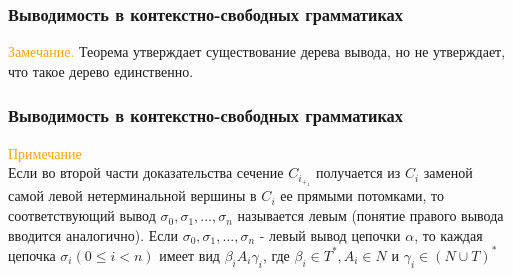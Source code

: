 \documentclass{beamer}
\begin{document}
		\begin{frame}
    \frametitle{Выводимость в контекстно-свободных грамматиках}
       
         \textcolor{orange}{Замечание.} Теорема утверждает существование дерева вывода, но не утверждает, что такое дерево единственно.
          
	\end{frame}
	
	\begin{frame}
    \frametitle{Выводимость в контекстно-свободных грамматиках}
    \textcolor{orange}{Примечание}\\
    Если во второй части доказательства сечение $C_i_+_1$ получается из $C_i$ заменой самой левой нетерминальной вершины в $C_i$ ее прямыми потомками, то соответствующий вывод $\sigma_0, \sigma_1, ..., \sigma_n$ называется левым (понятие правого вывода вводится аналогично).
    Если $\sigma_0, \sigma_1, ..., \sigma_n$ - левый вывод цепочки $\alpha$, то каждая цепочка $\sigma_i   (0 \leq i < n)$ имеет вид $\beta_iA_i\gamma_i$, где $\beta_i \in T^\ast, A_i \in N$ и $\gamma_i \in (N\cup T)^\ast$
	\end{frame}
	
\end{document}
